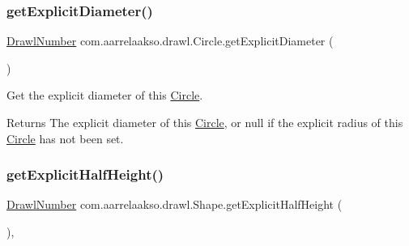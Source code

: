 \subsubsection{\texorpdfstring{get\+Explicit\+Diameter()}{getExplicitDiameter()}}
{\footnotesize\ttfamily \hyperlink{classcom_1_1aarrelaakso_1_1drawl_1_1_drawl_number}{Drawl\+Number} com.\+aarrelaakso.\+drawl.\+Circle.\+get\+Explicit\+Diameter (\begin{DoxyParamCaption}{ }\end{DoxyParamCaption})\hspace{0.3cm}{\ttfamily [private]}}



Get the explicit diameter of this \hyperlink{classcom_1_1aarrelaakso_1_1drawl_1_1_circle}{Circle}. 

\begin{DoxyReturn}{Returns}
The explicit diameter of this \hyperlink{classcom_1_1aarrelaakso_1_1drawl_1_1_circle}{Circle}, or {\ttfamily null} if the explicit radius of this \hyperlink{classcom_1_1aarrelaakso_1_1drawl_1_1_circle}{Circle} has not been set. 
\end{DoxyReturn}
\mbox{\label{classcom_1_1aarrelaakso_1_1drawl_1_1_shape_a7207aa8ba07ed18af81fb9d92a979cd6}} 
\subsubsection{\texorpdfstring{get\+Explicit\+Half\+Height()}{getExplicitHalfHeight()}}
{\footnotesize\ttfamily \hyperlink{classcom_1_1aarrelaakso_1_1drawl_1_1_drawl_number}{Drawl\+Number} com.\+aarrelaakso.\+drawl.\+Shape.\+get\+Explicit\+Half\+Height (\begin{DoxyParamCaption}{ }\end{DoxyParamCaption})\hspace{0.3cm}{\ttfamily [protected]}, {\ttfamily [inherited]}}

\mbox{\label{classcom_1_1aarrelaakso_1_1drawl_1_1_shape_af952f32cb1706da71c9cb75916f4d665}} 
